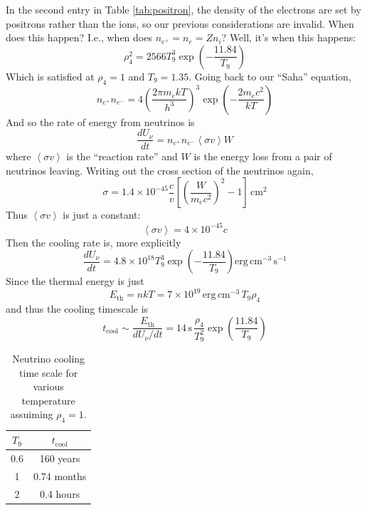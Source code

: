 \documentclass[10pt]{article}
\numberwithin{equation}{section}
\newcommand{\n}{\noindent}
\newcommand{\avg}[1]{\left\langle#1\right\rangle}
\begin{document}
    \n In the second entry in Table \ref{tab:positron}, the density of
    the electrons are set by positrons rather than the ions, so our
    previous considerations are invalid. When does this happen?
    I.e., when does $n_{e^+}=n_e=Zn_i$? Well, it's when this
    happens:
    \begin{equation}
      \label{eq:348}
      \rho_4^2=2566 T_9^3\exp\left(-\frac{11.84}{T_9}\right)
    \end{equation}
    Which is satisfied at $\rho_4=1$ and $T_9=1.35$. Going back to
    our ``Saha'' equation, 
    \begin{equation}
      \label{eq:349}
      n_{e^+}n_{e^-}=4\left(\frac{2\pi m_e kT}{h^3}\right)^3\exp\left(-
\frac{2m_ec^2}{kT}\right)
    \end{equation}
    And so the rate of energy from neutrinos is
    \begin{equation}
      \label{eq:350}
      \frac{dU_\nu}{dt}=n_{e^+}n_{e^-}\avg{\sigma v}W
    \end{equation}
    where $\avg{\sigma v}$ is the ``reaction rate'' and $W$ is the
    energy loss from a pair of neutrinos leaving. Writing out the
    cross section of the neutrinos again,
    \begin{equation}
      \label{eq:351}
      \sigma = 1.4\times 10^{-45}\frac{c}{v}\left[\left(\frac{W}
{m_ec^2}\right)^2-1\right]\,\mathrm{cm^2}
    \end{equation}
    Thus $\avg{\sigma v}$ is just a constant:
    \begin{equation}
      \label{eq:352}
      \avg{\sigma v}=4\times 10^{-45}c
    \end{equation}
    Then the cooling rate is, more explicitly
    \begin{equation}
      \label{eq:353}
      \frac{dU_\nu}{dt}=4.8\times 10^{18}T_9^3\exp\left(-\frac{11.84}
{T_9}\right)\mathrm{erg\,cm^{-3}\,s^{-1}}
    \end{equation}
    Since the thermal energy is just
    \begin{equation}
      \label{eq:354}
      E_{\mathrm{th}}=nkT=7\times 10^{19}\,\mathrm{erg\,cm^{-3}}\,T_9\rho_4
    \end{equation}
    and thus the cooling timescale is
    \begin{equation}
      \label{eq:355}
      t_{\mathrm{cool}}\sim\frac{E_{\mathrm{th}}}{dU_\nu/dt}=14\,\mathrm{s}
\,\frac{\rho_4}{T_9^2}\exp\left(\frac{11.84}{T_9}\right)
    \end{equation}
    \begin{table}[h]
      \centering
      \begin{tabular}{c c}
        $T_9$ & $t_{\mathrm{cool}}$\\
        \hline \hline
        0.6 & 160 years\\
        1 & 0.74 months\\
        2 & 0.4 hours
      \end{tabular}
      \caption{Neutrino cooling time scale for various temperature 
assuiming $\rho_4=1$.}
      \label{tab:cooling}
    \end{table}
\end{document}
